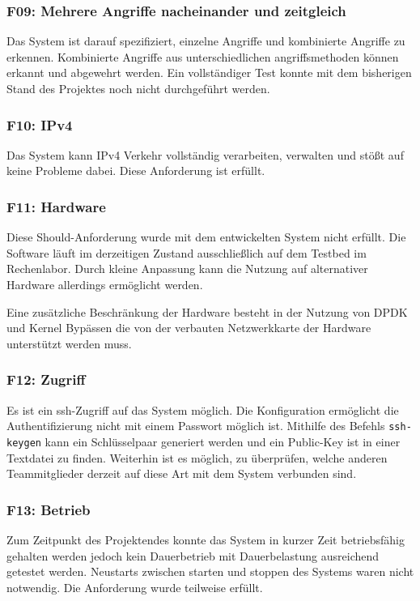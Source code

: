 \documentclass[../review_3.tex]{subfiles}
\begin{document}
\subsubsection{F09: Mehrere Angriffe nacheinander und zeitgleich}
Das System ist darauf spezifiziert, einzelne Angriffe und kombinierte Angriffe zu erkennen. Kombinierte Angriffe aus unterschiedlichen angriffsmethoden können erkannt und abgewehrt werden. Ein vollständiger Test konnte mit dem bisherigen Stand des Projektes noch nicht durchgeführt werden.

\subsubsection{F10: IPv4}
Das System kann IPv4 Verkehr vollständig verarbeiten, verwalten und stößt auf keine Probleme dabei. Diese Anforderung ist erfüllt.

\subsubsection{F11: Hardware}
Diese Should-Anforderung wurde mit dem entwickelten System nicht erfüllt. Die Software läuft im derzeitigen Zustand ausschließlich auf dem Testbed im Rechenlabor. Durch kleine Anpassung kann die Nutzung auf alternativer Hardware allerdings ermöglicht werden.

Eine zusätzliche Beschränkung der Hardware besteht in der Nutzung von DPDK und Kernel Bypässen die von der verbauten Netzwerkkarte der Hardware unterstützt werden muss.

\subsubsection{F12: Zugriff}
Es ist ein ssh-Zugriff auf das System möglich. Die Konfiguration ermöglicht die Authentifizierung nicht mit einem Passwort möglich ist. Mithilfe des Befehls \texttt{ssh-keygen} kann ein Schlüsselpaar generiert werden und ein Public-Key ist in einer Textdatei zu finden. Weiterhin ist es möglich, zu überprüfen, welche anderen Teammitglieder derzeit auf diese Art mit dem System verbunden sind.

\subsubsection{F13: Betrieb}
Zum Zeitpunkt des Projektendes konnte das System in kurzer Zeit betriebsfähig gehalten werden jedoch kein Dauerbetrieb mit Dauerbelastung ausreichend getestet werden. Neustarts zwischen starten und stoppen des Systems waren nicht notwendig.
Die Anforderung wurde teilweise erfüllt.
\end{document}
